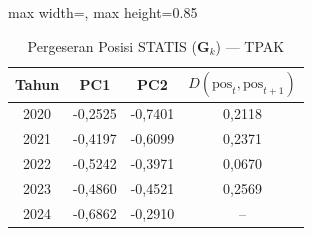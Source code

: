 \begin{table}[H]
\centering
\caption{Pergeseran Posisi STATIS ($\mathbf{G}_k$) --- TPAK} \label{tab:app1jarak_statis_loading_tpak}
\begin{adjustbox}{max width=\textwidth, max height=0.85\textheight}
\begin{tabular}{|c|c|c|c|}
\hline
\textbf{Tahun} & \textbf{PC1} & \textbf{PC2} & \textbf{$D(\text{pos}_t, \text{pos}_{t+1})$} \\
\hline
2020 & -0,2525 & -0,7401 & 0,2118 \\
2021 & -0,4197 & -0,6099 & 0,2371 \\
2022 & -0,5242 & -0,3971 & 0,0670 \\
2023 & -0,4860 & -0,4521 & 0,2569 \\
2024 & -0,6862 & -0,2910 & -- \\
\hline
\end{tabular}
\end{adjustbox}
\end{table}